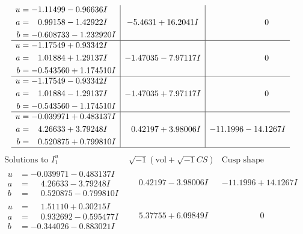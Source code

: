 \documentclass[1p]{elsarticle_modified}
\theoremstyle{definition}
\newcommand{\I}{\sqrt{-1}}
\begin{document}
$$\begin{array}{c|c|c}
\begin{aligned}
u &= -1.11499 - 0.96636 I \\
a &= \phantom{-}0.99158 - 1.42922 I \\
b &= -0.608733 - 1.232920 I\end{aligned}
 & -5.4631 + 16.2041 I & \phantom{-0.000000 } 0 \\ \hline\begin{aligned}
u &= -1.17549 + 0.93342 I \\
a &= \phantom{-}1.01884 + 1.29137 I \\
b &= -0.543560 + 1.174510 I\end{aligned}
 & -1.47035 - 7.97117 I & \phantom{-0.000000 } 0 \\ \hline\begin{aligned}
u &= -1.17549 - 0.93342 I \\
a &= \phantom{-}1.01884 - 1.29137 I \\
b &= -0.543560 - 1.174510 I\end{aligned}
 & -1.47035 + 7.97117 I & \phantom{-0.000000 } 0 \\ \hline\begin{aligned}
u &= -0.039971 + 0.483137 I \\
a &= \phantom{-}4.26633 + 3.79248 I \\
b &= \phantom{-}0.520875 + 0.799810 I\end{aligned}
 & \phantom{-}0.42197 + 3.98006 I & -11.1996 - 14.1267 I\\
 \hline 
 \end{array}$$\newpage$$\begin{array}{c|c|c}  
\text{Solutions to }I^u_{1}& \I (\text{vol} + \sqrt{-1}CS) & \text{Cusp shape}\\
 \hline 
\begin{aligned}
u &= -0.039971 - 0.483137 I \\
a &= \phantom{-}4.26633 - 3.79248 I \\
b &= \phantom{-}0.520875 - 0.799810 I\end{aligned}
 & \phantom{-}0.42197 - 3.98006 I & -11.1996 + 14.1267 I \\ \hline\begin{aligned}
u &= \phantom{-}1.51110 + 0.30215 I \\
a &= \phantom{-}0.932692 - 0.595477 I \\
b &= -0.344026 - 0.883021 I\end{aligned}
 & \phantom{-}5.37755 + 6.09849 I & \phantom{-0.000000 } 0 \\ \hline\begin{aligned}

\end{aligned}
\end{array}$$
\end{document}
